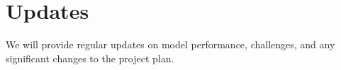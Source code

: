 \documentclass[10pt]{article}
\begin{document}
\section{Updates}


We will provide regular updates on model performance, challenges,
and any significant changes to the project plan.




\end{document}
